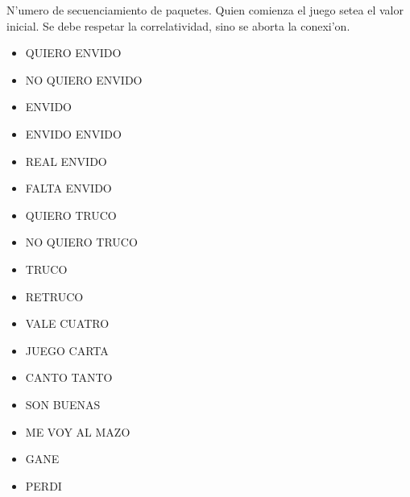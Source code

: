 
N'umero de secuenciamiento de paquetes. Quien comienza el juego setea el valor inicial. Se debe respetar la correlatividad, sino se aborta la conexi'on.


\begin{itemize}
\item QUIERO ENVIDO       
\item NO QUIERO ENVIDO    
\item ENVIDO              
\item ENVIDO ENVIDO       
\item REAL ENVIDO         
\item FALTA ENVIDO        
\item QUIERO TRUCO        
\item NO QUIERO TRUCO     
\item TRUCO               
\item RETRUCO             
\item VALE CUATRO         
\item JUEGO CARTA         
\item CANTO TANTO         
\item SON BUENAS          
\item ME VOY AL MAZO      
\item GANE                
\item PERDI               
\end{itemize}
